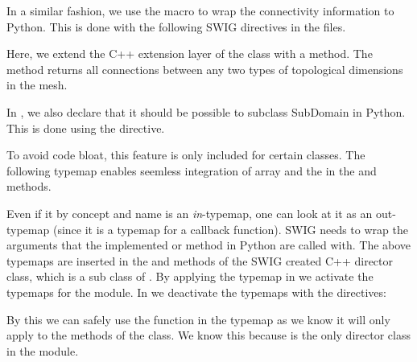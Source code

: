 In a similar fashion, we use the  macro to wrap the connectivity information to Python. This is done with the following SWIG directives in the  files.
Here, we extend the C++ extension layer of the
 class with a 
method. The method returns all connections between any two types of topological dimensions in the mesh.

In , we also declare that it should be possible to subclass SubDomain in Python. This is done using the  directive.
\begin{c++}
\end{c++}
To avoid code bloat, this feature is only included for certain classes.
The following typemap enables seemless integration of
\numpy array and the  in  
the  and  methods. 
Even if it by concept and name is an \textit{in}-typemap, one can look at it as an out-typemap
(since it is a typemap for a callback function). SWIG needs to wrap the arguments that the implemented  or  method in Python are called with. The above typemaps are inserted in the  and  methods of the SWIG created C++ director class, which is a sub class of . By applying the typemap in  we activate the typemaps for the  module. In  we deactivate the typemaps with the directives:
\begin{c++}
\end{c++}
By this we can safely use the function  in the typemap as we know it will only apply to the methods of the  class. We know this because  is the only director class in the  module.

